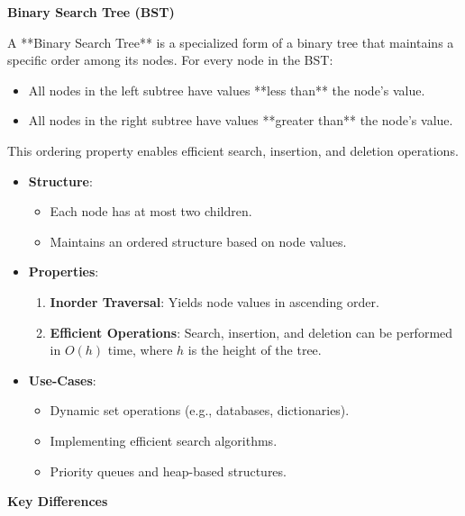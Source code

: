 \textbf{Binary Search Tree (BST)}

A **Binary Search Tree** is a specialized form of a binary tree that maintains a specific order among its nodes. For every node in the BST:

\begin{itemize}
    \item All nodes in the left subtree have values **less than** the node's value.
    \item All nodes in the right subtree have values **greater than** the node's value.
\end{itemize}

This ordering property enables efficient search, insertion, and deletion operations.

\begin{itemize}
    \item \textbf{Structure}:
    \begin{itemize}
        \item Each node has at most two children.
        \item Maintains an ordered structure based on node values.
    \end{itemize}
    
    \item \textbf{Properties}:
    \begin{enumerate}
        \item \textbf{Inorder Traversal}: Yields node values in ascending order.
        \item \textbf{Efficient Operations}: Search, insertion, and deletion can be performed in \(O(h)\) time, where \(h\) is the height of the tree.
    \end{enumerate}
    
    \item \textbf{Use-Cases}:
    \begin{itemize}
        \item Dynamic set operations (e.g., databases, dictionaries).
        \item Implementing efficient search algorithms.
        \item Priority queues and heap-based structures.
    \end{itemize}
\end{itemize}

\textbf{Key Differences}


